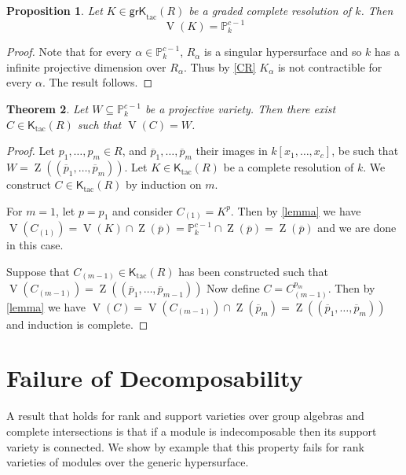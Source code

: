\documentclass{amsart}[11pt]
\newcommand{\V}{\operatorname{V}}
\newcommand{\Z}{\operatorname{Z}}
\newcommand{\Ktac}{\operatorname{\mathsf{K}_{tac}}\nolimits}
\newcommand{\grKtac}{\operatorname{\mathsf{grK}_{tac}}\nolimits}
\numberwithin{equation}{section}
\theoremstyle{plain}
\newtheorem{theorem}{Theorem}[section]
\newtheorem*{Main Theorem}{Main Theorem}
\newtheorem{proposition}[theorem]{Proposition}
\theoremstyle{definition}
\theoremstyle{remark}
\numberwithin{equation}{theorem}
\begin{document}
\begin{proposition}\label{K} Let $K\in\grKtac(R)$ be a graded complete resolution of $k$.  Then
\[
\V(K)=\mathbb P^{c-1}_k
\]
\end{proposition}

\begin{proof} Note that for every $\alpha\in\mathbb P^{c-1}_k$, $R_\alpha$ is a singular hypersurface and so 
$k$ has a infinite projective dimension over $R_\alpha$.  Thus by \ref{CR} $K_\alpha$ is not contractible for every $\alpha$.  The result follows.
\end{proof}

\begin{theorem}\label{realize} Let $W\subseteq \mathbb P^{c-1}_k$ be a projective variety.  Then there exist 
$C\in\Ktac(R)$ such that $\V(C)=W$.
\end{theorem}

\begin{proof} Let $p_1,\dots,p_m\in R$, and $\overline p_1,\dots,\overline p_m$ their images in 
$k[x_1,\dots,x_c]$, be such that $W=\Z((\overline p_1,\dots,\overline p_m))$. Let $K\in\Ktac(R)$ be a complete resolution of $k$. We construct $C\in\Ktac(R)$ by induction on $m$.

For $m=1$, let $p=p_1$ and consider $C_{(1)}=K^p$. Then by \ref{lemma} we have
$\V(C_{(1)})=\V(K)\cap\Z(\overline p)=\mathbb P^{c-1}_k\cap\Z(\overline p)=\Z(\overline p)$ and we are done in this case.

Suppose that $C_{(m-1)}\in\Ktac(R)$ has been constructed such that 
$\V(C_{(m-1)})=\Z((\overline p_1,\dots,\overline p_{m-1}))$  Now define $C=C_{(m-1)}^{p_m}$. Then by 
\ref{lemma} we have
$\V(C)=\V(C_{(m-1)})\cap\Z(\overline p_m)=\Z((\overline p_1,\dots,\overline p_m))$ and induction is complete.
\end{proof}




\section{Failure of Decomposability}

A result that holds for rank and support varieties over group algebras and complete intersections is that if a module is indecomposable then its support variety is connected.  We show by example that this property fails for rank varieties of modules over the generic hypersurface.
\end{document}
